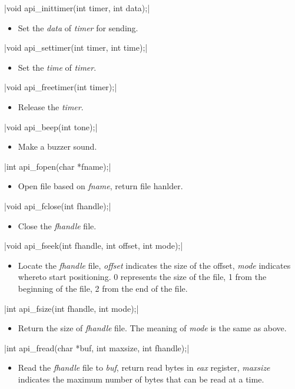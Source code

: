 \documentclass{swfcthesis}
\begin{document}
\csingle|void api_inittimer(int timer, int data);|
\begin{itemize}
\item Set the \emph{data} of \emph{timer} for sending.
\end{itemize}

\csingle|void api_settimer(int timer, int time);|
\begin{itemize}
\item Set the \emph{time} of \emph{timer}.
\end{itemize}

\csingle|void api_freetimer(int timer);|
\begin{itemize}
\item Release the \emph{timer}.
\end{itemize}

\csingle|void api_beep(int tone);|
\begin{itemize}
\item Make a buzzer sound.
\end{itemize}

\csingle|int api_fopen(char *fname);|
\begin{itemize}
\item Open file based on \emph{fname}, return file hanlder.
\end{itemize}

\csingle|void api_fclose(int fhandle);|
\begin{itemize}
\item Close the \emph{fhandle} file.
\end{itemize}

\csingle|void api_fseek(int fhandle, int offset, int mode);|
\begin{itemize}
\item Locate the \emph{fhandle} file, \emph{offset} indicates the size of the offset,
  \emph{mode} indicates whereto start positioning. 0 represents the size of the file, 1
  from the beginning of the file, 2 from the end of the file.
  
\end{itemize}

\csingle|int api_fsize(int fhandle, int mode);|
\begin{itemize}
\item Return the size of \emph{fhandle} file. The meaning of \emph{mode} is the same as
  above.
\end{itemize}

\csingle|int api_fread(char *buf, int maxsize, int fhandle);|
\begin{itemize}
\item Read the \emph{fhandle} file to \emph{buf}, return read bytes in \emph{eax}
  register, \emph{maxsize} indicates the maximum number of bytes that can be read at a
  time.
    
\end{itemize}
\end{document}

